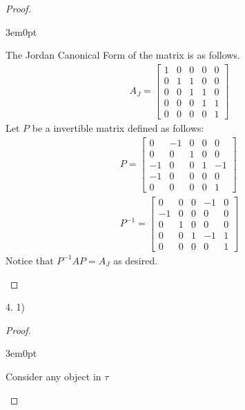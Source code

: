 \documentclass[11pt]{article}
\newenvironment{myproof}
{\begin{proof} \begin{adjustwidth}{3em}{0pt}$ $\par\nobreak\ignorespaces}
{\end{adjustwidth} \end{proof}}
\begin{document}
\begin{flushleft}
\begin{myproof}
The Jordan Canonical Form of the matrix is as follows.
\begin{align*}
A_J = \begin{bmatrix}
1 & 0 & 0 & 0 & 0 \\
0 & 1 & 1 & 0 & 0 \\
0 & 0 & 1 & 1 & 0 \\
0 & 0 & 0 & 1 & 1 \\
0 & 0 & 0 & 0 & 1
\end{bmatrix}
\end{align*}
Let $P$ be a invertible matrix defined as follows:
\begin{align*}
P = \begin{bmatrix}
0 & -1 & 0 & 0 & 0 \\
0 & 0 & 1 & 0 & 0 \\
-1 & 0 & 0 & 1 & -1 \\
-1 & 0 & 0 & 0 & 0 \\
0 & 0 & 0 & 0 & 1
\end{bmatrix} \\
P^{-1} = \begin{bmatrix}
0 & 0 & 0 & -1 & 0 \\
-1 & 0 & 0 & 0 & 0 \\
0 & 1 & 0 & 0 & 0 \\
0 & 0 & 1 & -1 & 1 \\
0 & 0 & 0 & 0 & 1
\end{bmatrix}
\end{align*}
Notice that $P^{-1}AP = A_J$ as desired.
\end{myproof}

\newpage

4. 1)

\begin{myproof}

Consider any object in $\tau$

\end{myproof}

\end{flushleft}
\end{document}
